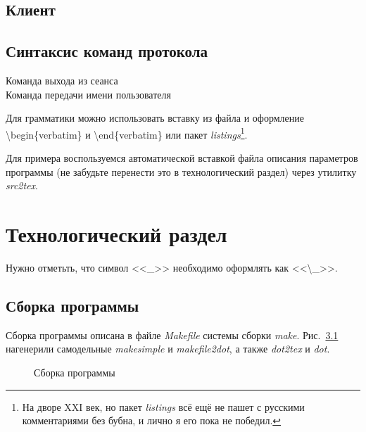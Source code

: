 \documentclass[a4paper,12pt]{report}
\begin{document}
\section{Клиент}

\section{Синтаксис команд протокола}

\begin{description}
\item[Команда выхода из сеанса]
% 
\item[Команда передачи имени пользователя]
% 
\end{description}

Для грамматики можно использовать вставку из файла и оформление \textbackslash{}begin\{verbatim\} и \textbackslash{}end\{verbatim\} или пакет \textit{listings}\footnote{На дворе XXI век, но пакет \textit{listings} всё ещё не пашет с русскими комментариями без бубна, и лично я его пока не победил.}.

Для примера воспользуемся автоматической вставкой файла описания параметров программы (не забудьте перенести это в технологический раздел) через утилитку \textit{src2tex}.

% 
% 

\chapter{Технологический раздел}

Нужно отметьть, что символ <<\_>> необходимо оформлять как <<\textbackslash\_>>.

\section{Сборка программы}

Сборка программы описана в файле \textit{Makefile} системы сборки \textit{make}. Рис.~\ref{fig:make} нагенерили самодельные \textit{makesimple} и \textit{makefile2dot}, а также \textit{dot2tex} и \textit{dot}.

\begin{figure}
\centering
\caption{Сборка программы}
\label{fig:make}
\end{figure}
\end{document}
